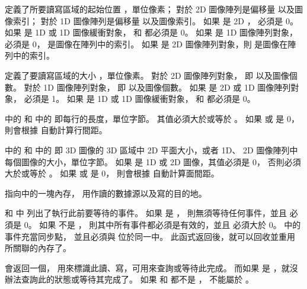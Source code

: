  定義了所要讀寫區域的起始位置 ，單位像素；
對於 2D 圖像陣列是偏移量  以及圖像索引；
對於 1D 圖像陣列是偏移量  以及圖像索引。
如果  是 2D ，  必須是 0。
如果  是 1D 或 1D 圖像緩衝對象，
 和  都必須是 0。
如果  是 1D 圖像陣列對象，
 必須是 0，  是圖像在陣列中的索引。
如果  是 2D 圖像陣列對象，則  是圖像在陣列中的索引。

 定義了要讀寫區域的大小 ，單位像素。
對於 2D 圖像陣列對象， 即  以及圖像個數。
對於 1D 圖像陣列對象， 即  以及圖像個數。
如果  是 2D 或 1D 圖像陣列對象，  必須是 1。
如果  是 1D 或 1D 圖像緩衝對象，
 和  都必須是 0。

 中的 
和  中的  即每行的長度，單位字節。
其值必須大於或等於 。
如果  或  是 0，
則會根據  自動計算行間距。

 中的 
和  中的 
即 3D 圖像的 3D 區域中 2D 平面大小，或者 1D、 2D 圖像陣列中每個圖像的大小，單位字節。
如果  是 1D 或 2D 圖像，其值必須是 0，
否則必須大於或等於 。
如果  或  是 0，
則會根據  自動計算面間距。

 指向中的一塊內存，
用作讀的數據源以及寫的目的地。

 和  中
列出了執行此前要等待的事件。
如果  是 ，
則無須等待任何事件，並且  必須是 0。
如果  不是 ，
則其中所有事件都必須是有效的，並且  必須大於 0。
 中的事件充當同步點，
並且必須與  位於同一中。
此函式返回後，就可以回收並重用  所關聯的內存了。

 會返回一個，
用來標識此讀、寫，可用來查詢或等待此完成。
而如果  是 ，就沒辦法查詢此的狀態或等待其完成了。
如果  和  都不是 ，
 不能屬於 。

